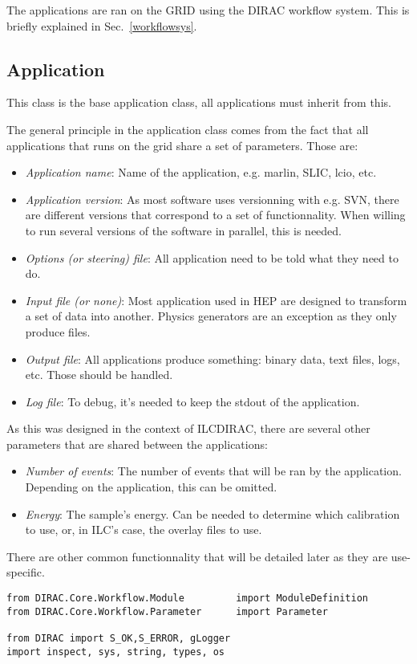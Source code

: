 \documentclass[a4paper,12pt]{article}
\begin{document}
The applications are ran on the GRID using the DIRAC workflow system. This is
briefly explained in Sec.~\ref{workflowsys}.

\subsection{Application}\label{application}
This class is the base application class, all applications must inherit from
this. 

The general principle in the application class comes from the fact that all
applications that runs on the grid share a set of parameters. Those are:
\begin{itemize}
  \item \emph{Application name}: Name of the application, e.g. marlin, SLIC,
  lcio, etc.
  \item \emph{Application version}: As most software uses versionning with e.g.
  SVN, there are different versions that correspond to a set of functionnality. When
  willing to run several versions of the software in parallel, this is needed.
  \item \emph{Options (or steering) file}: All application need to be told what
  they need to do. 
  \item \emph{Input file (or none)}: Most application used in HEP are designed
  to transform a set of data into another. Physics generators are an exception as
  they only produce files.
  \item \emph{Output file}: All applications produce something: binary data,
  text files, logs, etc. Those should be handled.
  \item \emph{Log file}: To debug, it's needed to keep the stdout of the
  application.
\end{itemize}
As this was designed in the context of ILCDIRAC, there are several other
parameters that are shared between the applications:
\begin{itemize}
  \item \emph{Number of events}: The number of events that will be ran by the
  application. Depending on the application, this can be omitted.
  \item \emph{Energy}: The sample's energy. Can be needed to determine which
  calibration to use, or, in ILC's case, the overlay files to use.
\end{itemize}
There are other common functionnality that will be detailed later as they are
use-specific.

\begin{lstlisting}[name=appli]
from DIRAC.Core.Workflow.Module         import ModuleDefinition
from DIRAC.Core.Workflow.Parameter      import Parameter

from DIRAC import S_OK,S_ERROR, gLogger
import inspect, sys, string, types, os
\end{lstlisting}
\end{document}
